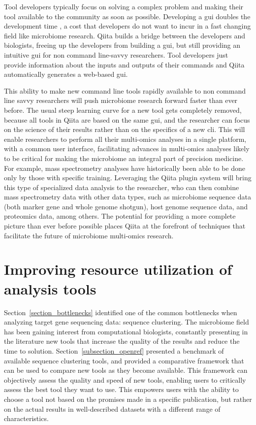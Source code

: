 Tool developers typically focus on solving a complex problem and making their
tool available to the community as soon as possible. Developing a \gls{gui} doubles
the development time \cite{Myers1992}, a cost that developers do not want to incur
in a fast changing field like microbiome research. Qiita builds a bridge between
the developers and biologists, freeing up the developers from building a \gls{gui},
but still providing an intuitive \gls{gui} for non command line-savvy researchers.
Tool developers just provide information about the inputs and outputs of their
commands and Qiita automatically generates a web-based \gls{gui}.

This ability to make new command line tools rapidly available to non command line
savvy researchers will push microbiome research forward faster than ever before.
The usual steep learning curve for a new tool gets completely removed, because all
tools in Qiita are based on the same \gls{gui}, and the researcher can focus on
the science of their results rather than on the specifics of a new \gls{cli}.
This will enable researchers to perform all their multi-omics analyses in a
single platform, with a common user interface, facilitating advances in
multi-omics analyses likely to be critical for making the microbiome an integral
part of precision medicine. For example, mass spectrometry analyses have
historically been able to be done only by those with specific training.
Leveraging the Qiita plugin system will bring this type of specialized data analysis
to the researcher, who can then combine mass spectrometry data with other data types,
such as microbiome sequence data (both marker gene and whole genome shotgun), host
genome sequence data, and proteomics data, among others. The potential for
providing a more complete picture than ever before possible places Qiita at the
forefront of techniques that facilitate the future of microbiome multi-omics research.

\section{Improving \hspace{0.01cm} resource \hspace{0.01cm} utilization \hspace{0.01cm} of \hspace{0.01cm} analysis tools}
Section~\ref{section_bottlenecks} identified one of the common bottlenecks when
analyzing target gene sequencing data: sequence clustering. The microbiome field
has been gaining interest from computational biologists, constantly presenting in
the literature new tools that increase the quality of the results and reduce the
time to solution. Section~\ref{subsection_openref} presented a benchmark of
available sequence clustering tools, and provided a comparative framework
that can be used to compare new tools as they become available. This framework can
objectively assess the quality and speed of new tools, enabling users to
critically assess the best tool they want to use. This empowers users with the
ability to choose a tool not based on the promises made in a specific publication,
but rather on the actual results in well-described datasets with a different range of
characteristics.

